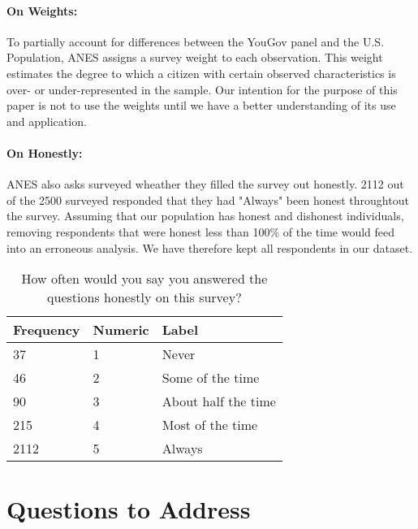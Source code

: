 \documentclass[12pt]{article}
\begin{document}
\paragraph{On Weights:}
To partially account for differences between the YouGov panel and the U.S. Population, ANES assigns a survey weight to each observation. This weight estimates the degree to which a citizen with certain observed characteristics is over- or under-represented in the sample. Our intention for the purpose of this paper is not to use the weights until we have a better understanding of its use and application.

\paragraph{On Honestly:}
ANES also asks surveyed wheather they filled the survey out honestly. 2112 out of the 2500 surveyed responded that they had "Always" been honest throughtout the survey. Assuming that our population has honest and dishonest individuals, removing respondents that were honest less than 100\% of the time would feed into an erroneous analysis. We have therefore kept all respondents in our dataset.  

\begin{table}[H]
    \centering
    \begin{tabular}{|l|l|l|}
    \hline
        Frequency & Numeric & Label \\ \hline
        37 & 1 & Never \\ \hline
        46 & 2 & Some of the time \\ \hline
        90 & 3 & About half the time \\ \hline
        215 & 4 & Most of the time \\ \hline
        2112 & 5 & Always \\ \hline
    \end{tabular}
    \caption{How often would you say you answered the questions honestly on this survey?}
\end{table}

\section{Questions to Address}
\end{document}
